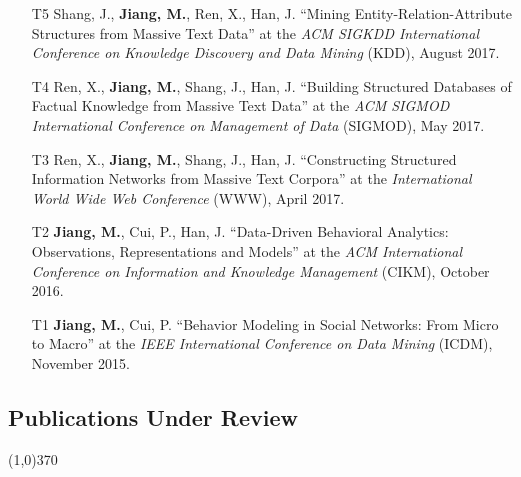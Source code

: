 \documentclass[10pt]{article}
\newenvironment{myindentpar}[1]%
{\begin{list}{}%
         {\setlength{\leftmargin}{#1}}%
         \item[]%
}
{\end{list}}
\newcounter{list}
\begin{document}
\begin{myindentpar}{0.00cm}
\begin{enumerate}[leftmargin=.5cm]
\item[T5] Shang, J., \textbf{Jiang, M.}, Ren, X., Han, J. ``Mining Entity-Relation-Attribute Structures from Massive Text Data'' at the \textit{ACM SIGKDD International Conference on Knowledge Discovery and Data Mining} (KDD), August 2017.

\item[T4] Ren, X., \textbf{Jiang, M.}, Shang, J., Han, J. ``Building Structured Databases of Factual Knowledge from Massive Text Data'' at the \textit{ACM SIGMOD International Conference on Management of Data} (SIGMOD), May 2017.
		
\item[T3] Ren, X., \textbf{Jiang, M.}, Shang, J., Han, J. ``Constructing Structured Information Networks from Massive Text Corpora'' at the \textit{International World Wide Web Conference}  (WWW), April 2017.

\item[T2] \textbf{Jiang, M.}, Cui, P., Han, J. ``Data-Driven Behavioral Analytics: Observations, Representations and Models'' at the \textit{ACM International Conference on Information and Knowledge Management} (CIKM), October 2016.
		
\item[T1] \textbf{Jiang, M.}, Cui, P. ``Behavior Modeling in Social Networks: From Micro to Macro'' at the \textit{IEEE International Conference on Data Mining} (ICDM), November 2015.

\end{enumerate}

\end{myindentpar}

\subsection{\sc Publications Under Review}
\vspace{-0.4cm} \line(1,0){370} \vspace{-0.1cm}
\end{document}
